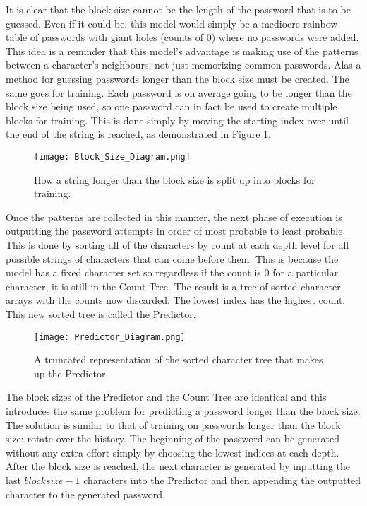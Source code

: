 \documentclass[11pt]{article}
\begin{document}
It is clear that the block size cannot be the length of the password that is to be guessed. Even if it could be, this model would simply be a mediocre rainbow table of passwords with giant holes (counts of 0) where no passwords were added. This idea is a reminder that this model's advantage is making use of the patterns between a character's neighbours, not just memorizing common passwords. Alas a method for guessing passwords longer than the block size must be created. The same goes for training. Each password is on average going to be longer than the block size being used, so one password can in fact be used to create multiple blocks for training. This is done simply by moving the starting index over until the end of the string is reached, as demonstrated in Figure \ref{fig:block_size_fig}.

\begin{figure}[H]
\centering
    \texttt{[image: Block\_Size\_Diagram.png]}
\caption{How a string longer than the block size is split up into blocks for training.}
\label{fig:block_size_fig}
\end{figure}

Once the patterns are collected in this manner, the next phase of execution is outputting the password attempts in order of most probable to least probable. This is done by sorting all of the characters by count at each depth level for all possible strings of characters that can come before them. This is because the model has a fixed character set so regardless if the count is 0 for a particular character, it is still in the Count Tree. The result is a tree of sorted character arrays with the counts now discarded. The lowest index has the highest count. This new sorted tree is called the Predictor.

\begin{figure}[H]
\centering
    \texttt{[image: Predictor\_Diagram.png]}
\caption{A truncated representation of the sorted character tree that makes up the Predictor.}
\label{fig:predictor_fig}
\end{figure}

The block sizes of the Predictor and the Count Tree are identical and this introduces the same problem for predicting a password longer than the block size. The solution is similar to that of training on passwords longer than the block size: rotate over the history. The beginning of the password can be generated without any extra effort simply by choosing the lowest indices at each depth. After the block size is reached, the next character is generated by inputting the last $block size - 1$ characters into the Predictor and then appending the outputted character to the generated password. 
\end{document}
